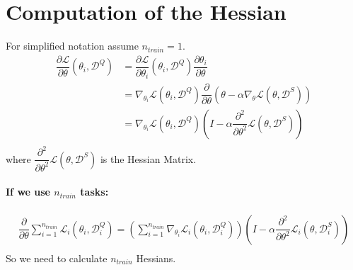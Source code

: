 \documentclass{article}
\begin{document}
\section{Computation of the Hessian}
For simplified notation assume $n_{train} = 1$.
\begin{align*}
	\dfrac{\partial \mathcal{L}}{\partial \theta}(\theta_i, \mathcal{D}^{Q}) &= \dfrac{\partial \mathcal{L}}{\partial \theta_i}(\theta_i, \mathcal{D}^{Q}) \dfrac{\partial \theta_i}{\partial \theta} \\
	&= \nabla_{\theta_i} \mathcal{L}(\theta_i, \mathcal{D}^{Q}) \dfrac{\partial}{\partial \theta}(\theta - \alpha \nabla_{\theta} \mathcal{L}(\theta, \mathcal{D}^{S})) \\
	&= \nabla_{\theta_i} \mathcal{L}(\theta_i, \mathcal{D}^{Q}) (I - \alpha \dfrac{\partial^2}{\partial \theta^2} \mathcal{L}(\theta, \mathcal{D}^{S})) \\
\end{align*}
where $\dfrac{\partial^2}{\partial \theta^2} \mathcal{L}(\theta, \mathcal{D}^{S})$ is the Hessian Matrix. 
\paragraph{If we use $n_{train}$ tasks:}
\begin{align}
	\dfrac{\partial}{\partial \theta} \sum_{i=1}^{n_{train}} \mathcal{L}_i(\theta_i, \mathcal{D}_i^{Q}) = \left( \sum_{i=1}^{n_{train}} \nabla_{\theta_i} \mathcal{L}_i(\theta_i, \mathcal{D}_i^{Q}) \right) \left( I - \alpha \dfrac{\partial^2}{\partial \theta^2} \mathcal{L}_i(\theta, \mathcal{D}_i^{S}) \right) \\
\end{align}
So we need to calculate $n_{train}$ Hessians. 
\end{document}
